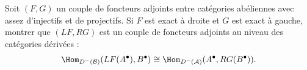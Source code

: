 \begin{exercice}\label{exo:derived-adjunction}
Soit $(F, G)$ un couple de foncteurs adjoints entre catégories abéliennes
avec assez d'injectifs et de projectifs. Si $F$ est exact à droite et $G$
est exact à gauche, montrer que $(LF, RG)$ est un couple de foncteurs
adjoints au niveau des catégories dérivées :
\[
  \Hom_{D^-(\mathcal{B})}(LF(A^\bullet), B^\bullet)
  \cong \Hom_{D^-(\mathcal{A})}(A^\bullet, RG(B^\bullet)).
\]
\end{exercice}

